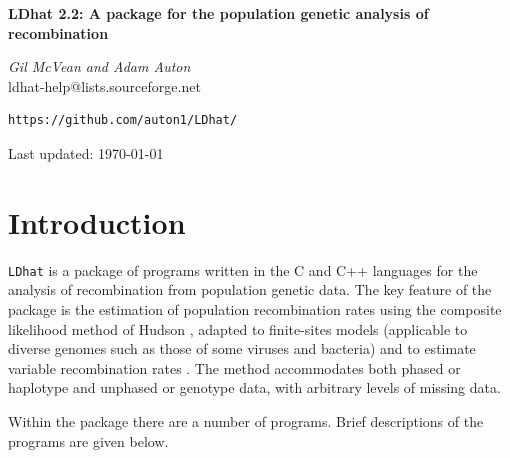 \documentclass[a4paper,10pt,fullpage]{article}
\begin{document}
\begin{titlepage}

\flushleft

{\Large \bf LDhat 2.2: A package for the population genetic analysis
of recombination\\}

\vspace{1.5cm} {\it Gil McVean and Adam Auton\\}
ldhat-help@lists.sourceforge.net\\
\begin{verbatim}
https://github.com/auton1/LDhat/
\end{verbatim}

\vspace{0.75cm}
\vspace{5.0cm}

Last updated: \today

\end{titlepage}

\tableofcontents

\newpage

\section{Introduction}
\verb+LDhat+ is a package of programs written in the C and C++ languages for the
analysis of recombination from population genetic data.  The key
feature of the package is the estimation of population
recombination rates using the composite likelihood method of
Hudson \cite{Hudson01}, adapted to finite-sites models (applicable
to diverse genomes such as those of some viruses and bacteria)
\cite{McVeanetal02} and to estimate variable recombination rates
\cite{McVeanetal04, AutonMcVean07}. The method accommodates both phased or
haplotype and unphased or genotype data, with arbitrary levels of
missing data.

Within the package there are a number of programs.  Brief
descriptions of the programs are given below.
\end{document}
